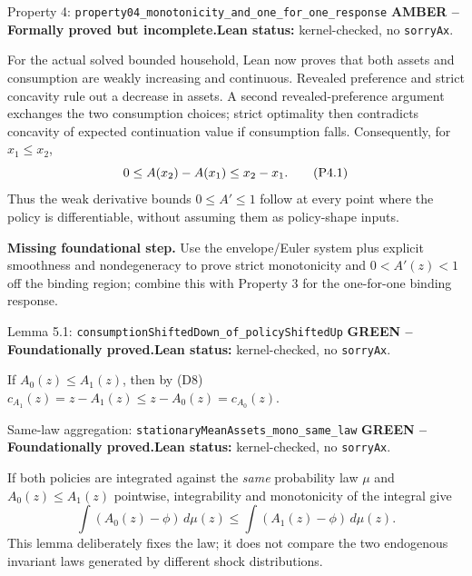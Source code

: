 \documentclass[11pt]{article}
\newcommand{\leanname}[1]{\nolinkurl{#1}}
\newcommand{\eqP}[1]{\refstepcounter{equation}\tag{P#1}}
\newcommand{\formalcheck}{\textbf{Lean status:} kernel-checked, no \texttt{sorryAx}.}
\newcommand{\missing}[1]{\par\smallskip\textbf{Missing foundational step.} #1}
\newcommand{\greenstatus}{\textcolor{proved}{\textbf{GREEN -- Foundationally proved.}}}
\newcommand{\amberstatus}{\textcolor{conditional}{\textbf{AMBER -- Formally proved but incomplete.}}}
\begin{document}
\begin{amberbox}{Property 4: \leanname{property04_monotonicity_and_one_for_one_response}}
\amberstatus\quad\formalcheck

For the actual solved bounded household, Lean now proves that both assets and
consumption are weakly increasing and continuous.  Revealed preference and
strict concavity rule out a decrease in assets.  A second revealed-preference
argument exchanges the two consumption choices; strict optimality then
contradicts concavity of expected continuation value if consumption falls.
Consequently, for \(x_1\le x_2\),
\begin{equation}
 0\le A(x_2)-A(x_1)\le x_2-x_1. \eqP{4.1}\label{P4.1}
\end{equation}
Thus the weak derivative bounds \(0\le A'\le1\) follow at every point where
the policy is differentiable, without assuming them as policy-shape inputs.

\missing{Use the envelope/Euler system plus explicit smoothness and
nondegeneracy to prove strict monotonicity and \(0<A'(z)<1\) off the binding
region; combine this with Property 3 for the one-for-one binding response.}
\end{amberbox}

\begin{greenbox}{Lemma 5.1: \leanname{consumptionShiftedDown_of_policyShiftedUp}}
\greenstatus\quad\formalcheck

If \(A_0(z)\le A_1(z)\), then by (D8)
\(c_{A_1}(z)=z-A_1(z)\le z-A_0(z)=c_{A_0}(z)\).
\end{greenbox}

\begin{greenbox}{Same-law aggregation:
\leanname{stationaryMeanAssets_mono_same_law}}
\greenstatus\quad\formalcheck

If both policies are integrated against the \emph{same} probability law
$\mu$ and $A_0(z)\le A_1(z)$ pointwise, integrability and monotonicity of the
integral give
\[
 \int (A_0(z)-\phi)\,d\mu(z)
 \le \int (A_1(z)-\phi)\,d\mu(z).
\]
This lemma deliberately fixes the law; it does not compare the two endogenous
invariant laws generated by different shock distributions.
\end{greenbox}
\end{document}
